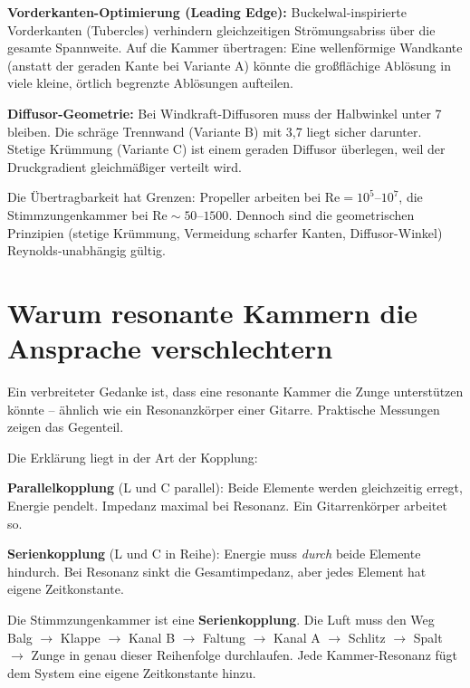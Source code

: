 \documentclass[11pt,a4paper]{article}
\begin{document}
\textbf{Vorderkanten-Optimierung (Leading Edge):} Buckelwal-inspirierte Vorderkanten (Tubercles) verhindern gleichzeitigen Strömungsabriss über die gesamte Spannweite. Auf die Kammer übertragen: Eine wellenförmige Wandkante (anstatt der geraden Kante bei Variante A) könnte die großflächige Ablösung in viele kleine, örtlich begrenzte Ablösungen aufteilen.

\textbf{Diffusor-Geometrie:} Bei Windkraft-Diffusoren muss der Halbwinkel unter 7\textdegree{} bleiben. Die schräge Trennwand (Variante B) mit 3{,}7\textdegree{} liegt sicher darunter. Stetige Krümmung (Variante C) ist einem geraden Diffusor überlegen, weil der Druckgradient gleichmäßiger verteilt wird.

\begin{keybox}
Die Übertragbarkeit hat Grenzen: Propeller arbeiten bei $\text{Re} = 10^5$--$10^7$, die Stimmzungenkammer bei $\text{Re} \sim 50$--$1500$. Dennoch sind die geometrischen Prinzipien (stetige Krümmung, Vermeidung scharfer Kanten, Diffusor-Winkel) Reynolds-unabhängig gültig.
\end{keybox}

\section{Warum resonante Kammern die Ansprache verschlechtern}

Ein verbreiteter Gedanke ist, dass eine resonante Kammer die Zunge unterstützen könnte -- ähnlich wie ein Resonanzkörper einer Gitarre. Praktische Messungen zeigen das Gegenteil.

Die Erklärung liegt in der Art der Kopplung:

\textbf{Parallelkopplung} (L und C parallel): Beide Elemente werden gleichzeitig erregt, Energie pendelt. Impedanz maximal bei Resonanz. Ein Gitarrenkörper arbeitet so.

\textbf{Serienkopplung} (L und C in Reihe): Energie muss \textit{durch} beide Elemente hindurch. Bei Resonanz sinkt die Gesamtimpedanz, aber jedes Element hat eigene Zeitkonstante.

\begin{keybox}
Die Stimmzungenkammer ist eine \textbf{Serienkopplung}. Die Luft muss den Weg Balg $\rightarrow$ Klappe $\rightarrow$ Kanal B $\rightarrow$ Faltung $\rightarrow$ Kanal A $\rightarrow$ Schlitz $\rightarrow$ Spalt $\rightarrow$ Zunge in genau dieser Reihenfolge durchlaufen. Jede Kammer-Resonanz fügt dem System eine eigene Zeitkonstante hinzu.
\end{keybox}
\end{document}
